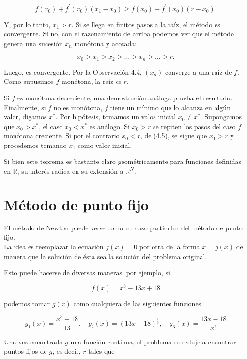 \documentclass[10pt]{book}
\begin{document}
\begin{equation*}
f\left(x_{0}\right)+f^{\prime}\left(x_{0}\right)\left(x_{1}-x_{0}\right) \geq f\left(x_{0}\right)+f^{\prime}\left(x_{0}\right)\left(r-x_{0}\right) . \tag{4.5}
\end{equation*}


Y, por lo tanto, $x_{1}>r$. Si se llega en finitos pasos a la raíz, el método es convergente. Si no, con el razonamiento de arriba podemos ver que el método genera una sucesión $x_{n}$ monótona y acotada:

$$
x_{0}>x_{1}>x_{2}>\ldots>x_{n}>\ldots>r .
$$

Luego, es convergente. Por la Observación 4.4, $\left(x_{n}\right)$ converge a una raíz de $f$. Como supusimos $f$ monótona, la raíz es $r$.

Si $f$ es monótona decreciente, una demostración análoga prueba el resultado. Finalmente, si $f$ no es monótona, $f$ tiene un mínimo que lo alcanza en algún valor, digamos $x^{*}$. Por hipótesis, tomamos un valos inicial $x_{0} \neq x^{*}$. Supongamos que $x_{0}>x^{*}$, el caso $x_{0}<x^{*}$ es análogo. Si $x_{0}>r$ se repiten los pasos del caso $f$ monótona creciente. Si por el contrario $x_{0}<r$, de (4.5), se sigue que $x_{1}>r$ y procedemos tomando $x_{1}$ como valor inicial.

Si bien este teorema es bastante claro geométricamente para funciones definidas en $\mathbb{R}$, su interés radica en su extensión a $\mathbb{R}^{N}$.

\section{Método de punto fijo}
El método de Newton puede verse como un caso particular del método de punto fijo.\\
La idea es reemplazar la ecuación $f(x)=0$ por otra de la forma $x=g(x)$ de manera que la solución de ésta sea la solución del problema original.

Esto puede hacerse de diversas maneras, por ejemplo, si

$$
f(x)=x^{3}-13 x+18
$$

podemos tomar $g(x)$ como cualquiera de las siguientes funciones

$$
g_{1}(x)=\frac{x^{3}+18}{13}, \quad g_{2}(x)=(13 x-18)^{\frac{1}{3}}, \quad g_{3}(x)=\frac{13 x-18}{x^{2}}
$$

Una vez encontrada $g$ una función continua, el problema se reduje a encontrar puntos fijos de $g$, es decir, $r$ tales que
\end{document}
